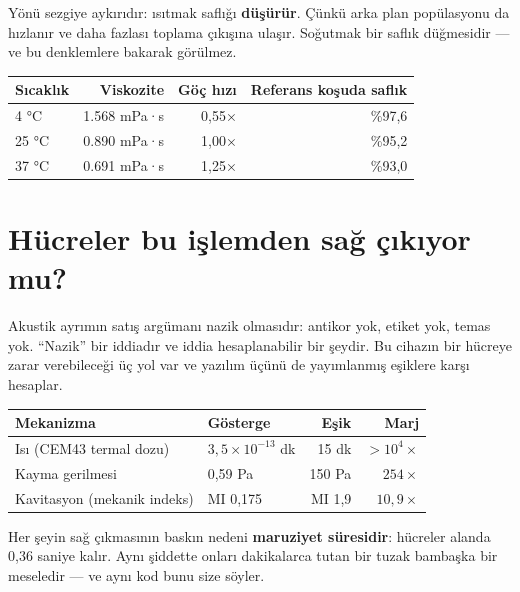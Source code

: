 \documentclass[11pt,a4paper]{article}
\begin{document}
\begin{plain}
Yönü sezgiye aykırıdır: ısıtmak saflığı \textbf{düşürür}. Çünkü arka plan
popülasyonu da hızlanır ve daha fazlası toplama çıkışına ulaşır. Soğutmak bir
saflık düğmesidir --- ve bu denklemlere bakarak görülmez.
\end{plain}

\begin{center}\small
\begin{tabular}{lrrr}
\toprule
\textbf{Sıcaklık} & \textbf{Viskozite} & \textbf{Göç hızı} & \textbf{Referans koşuda saflık} \\
\midrule
4 °C & \SI{1,568}{} mPa·s & 0,55× & \%97,6 \\
25 °C & \SI{0,890}{} mPa·s & 1,00× & \%95,2 \\
37 °C & \SI{0,691}{} mPa·s & 1,25× & \%93,0 \\
\bottomrule
\end{tabular}
\end{center}

\section{Hücreler bu işlemden sağ çıkıyor mu?}
\label{sec:viability}

Akustik ayrımın satış argümanı nazik olmasıdır: antikor yok, etiket yok, temas
yok. ``Nazik'' bir iddiadır ve iddia hesaplanabilir bir şeydir. Bu cihazın bir
hücreye zarar verebileceği üç yol var ve yazılım üçünü de yayımlanmış eşiklere
karşı hesaplar.

\begin{center}\small
\begin{tabular}{lp{3.6cm}rr}
\toprule
\textbf{Mekanizma} & \textbf{Gösterge} & \textbf{Eşik} & \textbf{Marj} \\
\midrule
Isı (CEM43 termal dozu) & $3{,}5\times10^{-13}$ dk & 15 dk & $>10^4\times$ \\
Kayma gerilmesi & 0,59 Pa & 150 Pa & $254\times$ \\
Kavitasyon (mekanik indeks) & MI 0,175 & MI 1,9 & $10{,}9\times$ \\
\bottomrule
\end{tabular}
\end{center}

\begin{plain}
Her şeyin sağ çıkmasının baskın nedeni \textbf{maruziyet süresidir}: hücreler
alanda 0,36 saniye kalır. Aynı şiddette onları dakikalarca tutan bir tuzak
bambaşka bir meseledir --- ve aynı kod bunu size söyler.
\end{plain}
\end{document}
